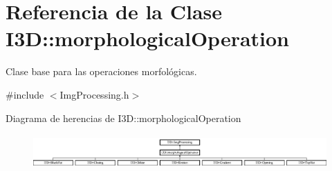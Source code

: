 \hypertarget{class_i3_d_1_1morphological_operation}{}\section{Referencia de la Clase I3D\+:\+:morphological\+Operation}
\label{class_i3_d_1_1morphological_operation}


Clase base para las operaciones morfológicas.  




{\ttfamily \#include $<$Img\+Processing.\+h$>$}

Diagrama de herencias de I3D\+:\+:morphological\+Operation\begin{figure}[H]
\begin{center}
\leavevmode
\includegraphics[height=1.333333cm]{class_i3_d_1_1morphological_operation}
\end{center}
\end{figure}
